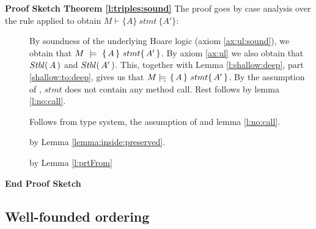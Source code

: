 \noindent
\vspace{.2cm}
 {\textbf{Proof Sketch Theorem \ref{l:triples:sound}} 
The proof goes by case analysis over the rule applied to obtain $M \vdash \{ A \}\ stmt \  \{ A' \} $:

\begin{description} 

\item[{}] 
By  soundness of the underlying Hoare logic (axiom \ref{ax:ul:sound}), we obtain that  $M\ \models\  \{\, A \, \}\ stmt \{\, A' \, \}$.
By axiom \ref{ax:ul} we also obtain that ${Stbl(\, A\, )}$ and  ${Stbl(\, A'\, )}$. 
This, together with   Lemma \ref{l:shallow:deep}, part \ref{shallow:to:deep}, gives us that
$M \models\!\!\!\!_{_{\circ}}\   \{\, A \, \}\ stmt \{\, A' \, \}  $. 
By the assumption of {}, $stmt$ does not contain any method call. Rest follows by lemma \ref{l:no:call}.

\item[{}] 

Follows from type system, the assumption of {} and lemma \ref{l:no:call}.

\item[{}] by Lemma \ref{lemma:inside:preserved}.

\item[{}] by Lemma \ref{l:prtFrom}

\end{description}
\noindent
\vspace{.1cm}
{\textbf{End Proof Sketch}} 


\subsection{Well-founded ordering}

}
